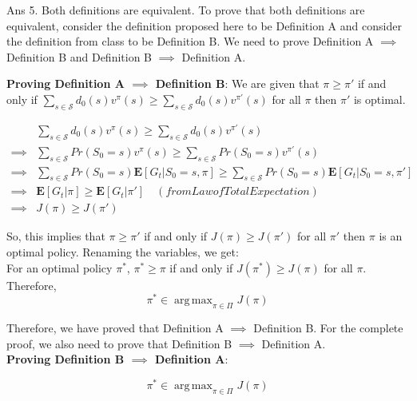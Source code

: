 \documentclass[]{article}
\DeclareMathOperator*{\argmax}{arg\,max}
\begin{document}
\begin{enumerate}
	{
		\color{blue}
			Ans 5. Both definitions are equivalent. To prove that both definitions are equivalent, consider the definition proposed here to be Definition A and consider the definition from class to be Definition B. We need to prove Definition A $\implies$ Definition B and Definition B $\implies$ Definition A.

\textbf{Proving Definition A $\implies$ Definition B}: We are given that $\pi \geq \pi'$ if and only if $\sum_{s \in \mathcal S} d_0(s) v^\pi(s) \geq \sum_{s \in \mathcal S} d_0(s) v^{\pi'}(s)$ for all $\pi$ then $\pi'$ is optimal.

				\begin{align}
        				&\sum_{s \in \mathcal S} d_0(s) v^\pi(s) \geq \sum_{s \in \mathcal S} d_0(s) v^{\pi'}(s) \\
				\implies &\sum_{s \in \mathcal S} Pr(S_0 = s) v^\pi(s) \geq \sum_{s \in \mathcal S} Pr(S_0 = s) v^{\pi'}(s) \\
				\implies &\sum_{s \in \mathcal S} Pr(S_0 = s) \mathbf{E}[G_t | S_0 = s, \pi] \geq \sum_{s \in \mathcal S} Pr(S_0 = s) \mathbf{E}[G_t | S_0 = s, \pi'] \\
				\implies &\mathbf{E}[G_t | \pi] \geq \mathbf{E}[G_t | \pi'] \quad (from Law of Total Expectation) \\
				\implies &J(\pi) \geq J(\pi')  
				\end{align}

			So, this implies that $\pi \geq \pi'$ if and only if $J(\pi) \geq J(\pi')$ for all $\pi'$ then $\pi$ is an optimal policy. Renaming the variables, we get: \\
			For an optimal policy $\pi^*$, $\pi^* \geq \pi$ if and only if $J(\pi^*) \geq J(\pi)$ for all $\pi$. Therefore, \\

			\begin{equation}
			        \label{eq:optimalPolicyOriginal}
			        \pi^* \in \argmax_{\pi \in \Pi} J(\pi) 
			    \end{equation} 

			Therefore, we have proved that Definition A $\implies$ Definition B. For the complete proof, we also need to prove that Definition B $\implies$ Definition A. \\

\textbf{Proving Definition B $\implies$ Definition A}: 

			\begin{equation}
			        \label{eq:optimalPolicyOriginal}
			        \pi^* \in \argmax_{\pi \in \Pi} J(\pi) 
			    \end{equation} 

}
\end{enumerate}
\end{document}
